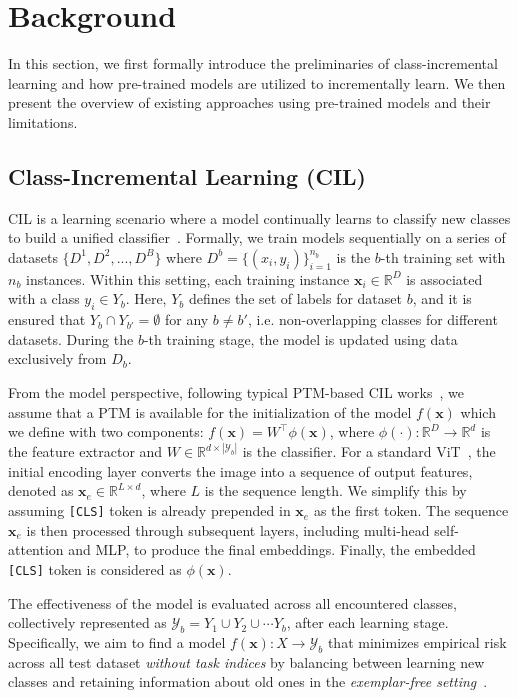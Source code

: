 \section{Background}
In this section, we first formally introduce the preliminaries of class-incremental learning and how pre-trained models are utilized to incrementally learn. We then present the overview of existing approaches using pre-trained models and their limitations.

\subsection{Class-Incremental Learning (CIL)}
CIL is a learning scenario where a model continually learns to classify new classes to build a unified classifier~\cite{icarl}.
Formally, we train models sequentially on a series of datasets $\{D^1, D^2, ... , D^B\}$ where $D^b = \{(x_i, y_i)\}_{i=1}^{n_b}$ is the $b$-th training set with $n_b$ instances.
Within this setting, each training instance $\mathbf{x}_i \in \mathbb{R}^D$ is associated with a class $y_i \in Y_b$. Here, $Y_b$ defines the set of labels for dataset $b$, and it is ensured that $Y_b \cap Y_{b'} = \emptyset$ for any $b \neq b'$, i.e. non-overlapping classes for different datasets. During the $b$-th training stage, the model is updated using data exclusively from $D_b$.

From the model perspective, following typical PTM-based CIL works~\cite{l2p, dualprompt, codaprompt, simplecil_aper, ease, mos}, we assume that a PTM is available for the initialization of the model $f(\mathbf{x})$ which we define with two components: $f(\mathbf{x}) = W^\top \phi(\mathbf{x})$, where $\phi(\cdot) : \mathbb{R}^D \to \mathbb{R}^d$ is the feature extractor and $W \in \mathbb{R}^{d \times |\mathcal{Y}_b|}$ is the classifier.
For a standard ViT~\cite{vit}, the initial encoding layer converts the image into a sequence of output features, denoted as $\mathbf{x}_e \in \mathbb{R}^{L \times d}$, where $L$ is the sequence length. We simplify this by assuming \texttt{[CLS]} token is already prepended in $\mathbf{x}_e$ as the first token. The sequence $\mathbf{x}_e$ is then processed through subsequent layers, including multi-head self-attention and MLP, to produce the final embeddings. Finally, the embedded \texttt{[CLS]} token is considered as $\phi(\mathbf{x})$.

The effectiveness of the model is evaluated across all encountered classes, collectively represented as $\mathcal{Y}_b = Y_1 \cup Y_2 \cup \cdots Y_b$, after each learning stage.
Specifically, we aim to find a model $f(\mathbf{x}) : X \rightarrow \mathcal{Y}_b$ that minimizes empirical risk across all test dataset \textit{without task indices} by balancing between learning new classes and retaining information about old ones in the \textit{exemplar-free setting}~\cite{l2p, dualprompt, codaprompt, simplecil_aper, ease, mos}.


